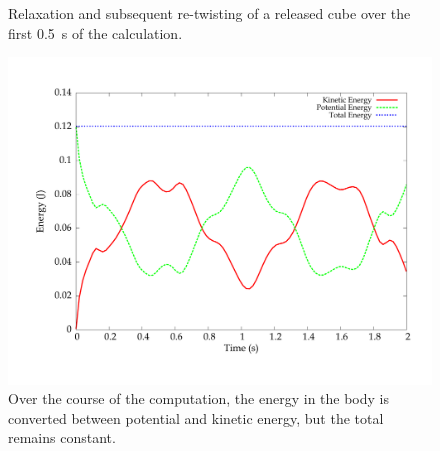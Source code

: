 \begin{figure}
\begin{center}
{    }
    \caption{Relaxation and subsequent re-twisting of a released cube
      over the first 0.5~s of the calculation.}
  \end{center}
  \label{fig:narayanan:releasedcube}
\end{figure}

\begin{figure}
  \begin{center}
    \includegraphics[scale=10]{chapters/narayanan/images/pdf/energies.pdf}
  \end{center}
  \caption{Over the course of the computation, the energy in the body
    is converted between potential and kinetic energy, but the total
    remains constant.}
    \label{fig:narayanan:energies}
\end{figure}

